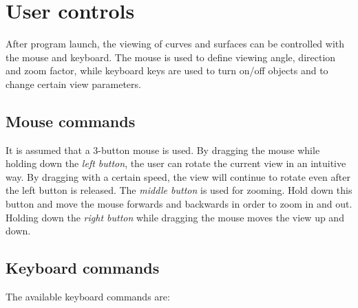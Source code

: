 \section{User controls}

After program launch, the viewing of curves and surfaces can be controlled with the mouse
and keyboard.  The mouse is used to define viewing angle, direction and zoom factor, while
keyboard keys are used to turn on/off objects and to change certain view parameters.

\subsection{Mouse commands}
It is assumed that a 3-button mouse is used.  By dragging the mouse while holding down the
\emph{left button}, the user can rotate the current view in an intuitive way.  By dragging
with a certain speed, the view will continue to rotate even after the left button is released.
The \emph{middle button} is used for zooming.  Hold down this button and move the mouse 
forwards and backwards in order to zoom in and out.  Holding down the \emph{right button}
while dragging the mouse moves the view up and down.

\subsection{Keyboard commands}

The available keyboard commands are:

